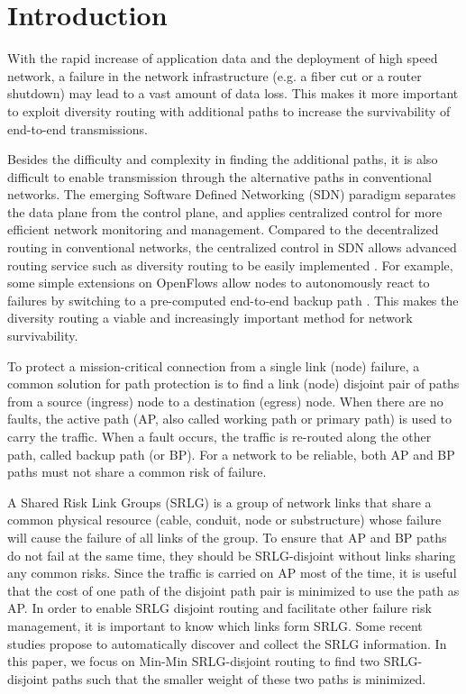 \section{Introduction}
With the rapid increase of application data and the deployment of high speed network, a failure in the network infrastructure (e.g. a fiber cut or a router shutdown) may lead to a vast amount of data loss. This makes it more important to exploit diversity routing with additional paths to increase the survivability \cite{yallouz2017tunable} of end-to-end transmissions.

Besides the difficulty and complexity in finding the additional paths, it is also difficult to enable transmission through the alternative paths in conventional networks. The emerging Software Defined Networking (SDN) paradigm \cite{mckeown2008openflow,jain2013b4} separates the data plane from the control plane, and applies centralized control for more efficient network monitoring and management. Compared to the decentralized routing in conventional networks, the centralized control in SDN allows advanced routing service such as diversity routing to be easily implemented \cite{jarschel2014interfaces,muller2014survivor,lopez2016role}. For example, some simple extensions on OpenFlows allow nodes to autonomously react to failures by switching to a pre-computed end-to-end backup path \cite{kempf2012scalable,sgambelluri2013openflow}. This makes the diversity routing a viable and increasingly important method for network survivability.



 To protect a mission-critical connection from a single link (node) failure, a common solution for path protection \cite{kuipers2012overview} is to find a link (node) disjoint pair of paths from a source (ingress) node to a destination (egress) node. When there are no faults, the active path (AP, also called working path or primary path) is used to carry the traffic. When a fault occurs, the traffic is re-routed along the other path, called backup path (or BP). For a network to be reliable, both AP and BP paths must not share a common risk of failure.

A Shared Risk Link Groups (SRLG) is a group of network links that share a common physical resource (cable, conduit, node or substructure) whose failure will cause the failure of all links of the group.
To ensure that AP and BP paths do not fail at the same time, they should be SRLG-disjoint without links sharing any common risks. Since the traffic is carried on AP most of the time, it is useful that the cost of one path of the disjoint path pair is minimized to use the  path as AP. In order to enable SRLG disjoint routing and facilitate other failure risk management, it is important to know which links form SRLG. Some recent studies \cite{sebos2001auto,zhang2017rsvp} propose to automatically discover and collect the SRLG information. %
In this paper, we focus on Min-Min SRLG-disjoint routing to find two SRLG-disjoint paths such that the smaller weight of these two paths is minimized.

